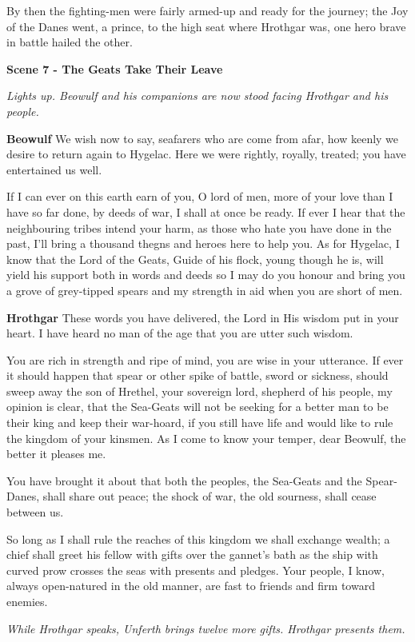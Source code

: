 \documentclass[a4paper]{article}
\begin{document}
{By then the fighting-men were fairly armed-up
and ready for the journey; the Joy of the Danes went,
a prince, to the high seat where Hrothgar was,
one hero brave in battle hailed the other.

\centerline{\textbf{Scene 7 - The Geats Take Their Leave}}
\centerline{\textit{Lights up. Beowulf and his companions are now stood facing Hrothgar and his people.}}

\textbf{Beowulf} We wish now to say, seafarers who
are come from afar, how keenly we desire
to return again to Hygelac. Here we were rightly,
royally, treated; you have entertained us well.

If I can ever on this earth earn of you,
O lord of men, more of your love
than I have so far done, by deeds of war,
I shall at once be ready. If ever I hear
that the neighbouring tribes intend your harm,
as those who hate you have done in the past,
I’ll bring a thousand thegns and heroes
here to help you. As for Hygelac, I know
that the Lord of the Geats, Guide of his flock,
young though he is, will yield his support
both in words and deeds so I may do you honour
and bring you a grove of grey-tipped spears
and my strength in aid when you are short of men.

\textbf{Hrothgar} These words you have delivered, the Lord in His wisdom
put in your heart. I have heard no man
of the age that you are utter such wisdom.

You are rich in strength and ripe of mind,
you are wise in your utterance. If ever it should happen
that spear or other spike of battle,
sword or sickness, should sweep away
the son of Hrethel, your sovereign lord,
shepherd of his people, my opinion is clear,
that the Sea-Geats will not be seeking for a better
man to be their king and keep their war-hoard,
if you still have life and would like to rule
the kingdom of your kinsmen. As I come to know
your temper, dear Beowulf, the better it pleases me.

You have brought it about that both the peoples,
the Sea-Geats and the Spear-Danes,
shall share out peace; the shock of war,
the old sourness, shall cease between us.

So long as I shall rule the reaches of this kingdom
we shall exchange wealth; a chief shall greet
his fellow with gifts over the gannet’s bath
as the ship with curved prow crosses the seas
with presents and pledges. Your people, I know,
always open-natured in the old manner,
are fast to friends and firm toward enemies.

\centerline{\textit{While Hrothgar speaks, Unferth brings twelve more gifts. Hrothgar presents them.}}

}
\end{document}
